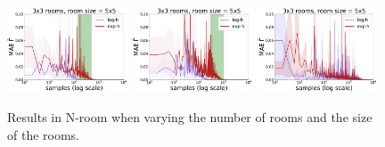 \begin{figure}
  \includegraphics*[width=0.32\textwidth]{figures/chapter2/online/nrooms_3_3_gammas.pdf}
  \includegraphics*[width=0.32\textwidth]{figures/chapter2/online/nrooms_5_5_gammas.pdf}
  \includegraphics*[width=0.32\textwidth]{figures/chapter2/online/nrooms_8_8_gammas.pdf}


  \caption{Results in N-room when varying the number of rooms and the size of the rooms.}
  \label{fig:halmdps_nrooms}
  \end{figure}
  


